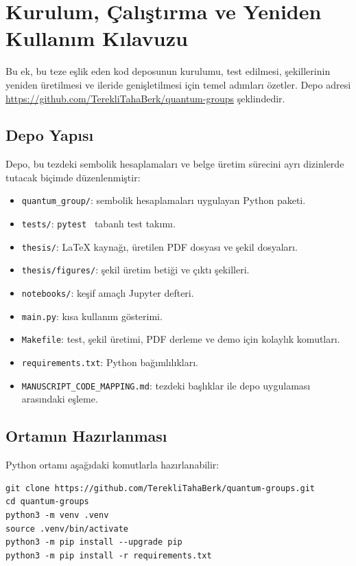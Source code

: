 \documentclass[12pt,a4paper]{report}
\numberwithin{equation}{chapter}
\theoremstyle{plain}
\theoremstyle{definition}
\begin{document}
\chapter{Kurulum, Çalıştırma ve Yeniden Kullanım Kılavuzu}

Bu ek, bu teze eşlik eden kod deposunun kurulumu, test edilmesi, şekillerinin
yeniden üretilmesi ve ileride genişletilmesi için temel adımları özetler. Depo
adresi \url{https://github.com/TerekliTahaBerk/quantum-groups} şeklindedir.

\section{Depo Yapısı}

Depo, bu tezdeki sembolik hesaplamaları ve belge üretim sürecini ayrı
dizinlerde tutacak biçimde düzenlenmiştir:
\begin{itemize}[leftmargin=*]
  \item \texttt{quantum\_group/}: sembolik hesaplamaları uygulayan Python
        paketi.
  \item \texttt{tests/}: \texttt{pytest}~\cite{pytest} tabanlı test takımı.
  \item \texttt{thesis/}: LaTeX kaynağı, üretilen PDF dosyası ve şekil
        dosyaları.
  \item \texttt{thesis/figures/}: şekil üretim betiği ve çıktı şekilleri.
  \item \texttt{notebooks/}: keşif amaçlı Jupyter defteri.
  \item \texttt{main.py}: kısa kullanım gösterimi.
  \item \texttt{Makefile}: test, şekil üretimi, PDF derleme ve demo için
        kolaylık komutları.
  \item \texttt{requirements.txt}: Python bağımlılıkları.
  \item \texttt{MANUSCRIPT\_CODE\_MAPPING.md}: tezdeki başlıklar ile
        depo uygulaması arasındaki eşleme.
\end{itemize}

\section{Ortamın Hazırlanması}

Python ortamı aşağıdaki komutlarla hazırlanabilir:
\begin{lstlisting}[style=bashblock]
git clone https://github.com/TerekliTahaBerk/quantum-groups.git
cd quantum-groups
python3 -m venv .venv
source .venv/bin/activate
python3 -m pip install --upgrade pip
python3 -m pip install -r requirements.txt
\end{lstlisting}
\end{document}
